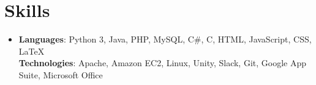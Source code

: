 \documentclass[letterpaper,11pt]{article}
\newcommand{\resumeSubHeadingListStart}{\begin{itemize}[leftmargin=*]}
\newcommand{\resumeSubHeadingListEnd}{\end{itemize}}
\begin{document}
\section{Skills}
 \resumeSubHeadingListStart
    \item[]{
      \textbf{Languages}{: Python 3, Java, PHP, MySQL, C\#, C, HTML, JavaScript, CSS, LaTeX}
      \hfill
      \\
      \textbf{Technologies}{: Apache, Amazon EC2, Linux, Unity, Slack, Git, Google App Suite, Microsoft Office}
    }
  \resumeSubHeadingListEnd
\end{document}
